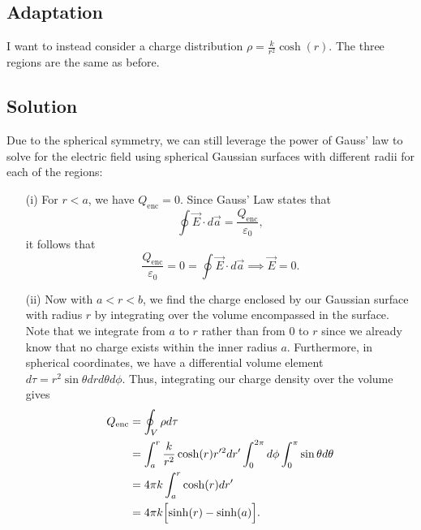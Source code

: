 \documentclass{article}
\begin{document}
\subsection*{Adaptation}
I want to instead consider a charge distribution $\rho = \frac{k}{r^2}\cosh(r)$. The three regions are the same as before.

\subsection*{Solution}
Due to the spherical symmetry, we can still leverage the power of Gauss' law to solve for the electric field using spherical Gaussian surfaces with different radii for each of the regions:
\begin{itemize}
	\item[(i)] For $r < a$, we have $Q_\textrm{enc}=0$. Since Gauss' Law states that
	\begin{equation}
		\oint\vec{E}\cdot d\vec{a} = \frac{Q_\textrm{enc}}{\varepsilon_0}\label{eq:gauss},
	\end{equation}
	it follows that
	\begin{equation}
		\frac{Q_\textrm{enc}}{\varepsilon_0} = 0 = \oint\vec{E}\cdot d\vec{a} \implies \boxed{\vec{E} = 0}.
	\end{equation}

	\item[(ii)] Now with $a < r < b$, we find the charge enclosed by our Gaussian surface with radius $r$ by integrating over the volume encompassed in the surface. Note that we integrate from $a$ to $r$ rather than from $0$ to $r$ since we already know that no charge exists within the inner radius $a$. Furthermore, in spherical coordinates, we have a differential volume element $d\tau = r^2\sin\theta drd\theta d\phi$. Thus, integrating our charge density over the volume gives
	\begin{align*}
		Q_\textrm{enc} &= \oint_V \rho d\tau\\
		&= \int_{a}^{r} \frac{k}{r^2}\cosh(r) r'^2dr' \int_{0}^{2\pi} d\phi \int_{0}^{\pi} \sin\theta d\theta \\
		&= 4\pi k\int_a^r \cosh(r) dr' \\
		&= 4\pi k \Bigl[\sinh(r) - \sinh(a)\Bigr].
	\end{align*}
	

\end{itemize}
\end{document}
